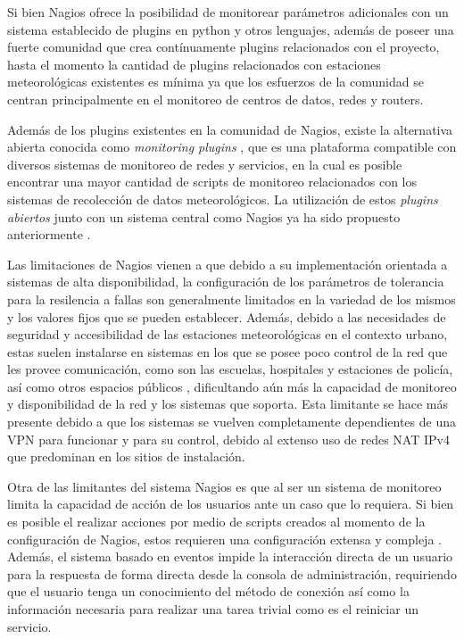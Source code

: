 Si bien Nagios ofrece la posibilidad de monitorear parámetros adicionales con un sistema establecido de plugins en python y otros lenguajes, además de poseer una fuerte comunidad que crea contínuamente plugins relacionados con el proyecto, hasta el momento la cantidad de plugins relacionados con estaciones meteorológicas existentes es mínima ya que los esfuerzos de la comunidad se centran principalmente en el monitoreo de centros de datos, redes y routers.

Además de los plugins existentes en la comunidad de Nagios, existe la alternativa abierta conocida como \textit{monitoring plugins} \cite{monitoring_plugins}, que es una plataforma compatible con diversos sistemas de monitoreo de redes y servicios, en la cual es posible encontrar una mayor cantidad de scripts de monitoreo relacionados con los sistemas de recolección de datos meteorológicos. La utilización de estos \textit{plugins abiertos} junto con un sistema central como Nagios ya ha sido propuesto anteriormente \cite{monitoreo_raspberry_nagios}.


Las limitaciones de Nagios vienen a que debido a su implementación orientada a sistemas de alta disponibilidad, la configuración de los parámetros de tolerancia para la resilencia a fallas son generalmente limitados en la variedad de los mismos y los valores fijos que se pueden establecer. Además, debido a las necesidades de seguridad y accesibilidad de las estaciones meteorológicas en el contexto urbano, estas suelen instalarse en sistemas en los que se posee poco control de la red que les provee comunicación, como son las escuelas, hospitales y estaciones de policía, así como otros espacios públicos \cite{muller_sensors_and_the_city}, dificultando aún más la capacidad de monitoreo y disponibilidad de la red y los sistemas que soporta. Esta limitante se hace más presente debido a que los sistemas se vuelven completamente dependientes de una VPN para funcionar y para su control, debido al extenso uso de redes NAT IPv4 que predominan en los sitios de instalación.

Otra de las limitantes del sistema Nagios es que al ser un sistema de monitoreo limita la capacidad de acción de los usuarios ante un caso que lo requiera. Si bien es posible el realizar acciones por medio de scripts creados al momento de la configuración de Nagios, estos requieren una configuración extensa y compleja \cite{nagios_service_restart}. Además, el sistema basado en eventos impide la interacción directa de un usuario para la respuesta de forma directa desde la consola de administración, requiriendo que el usuario tenga un conocimiento del método de conexión así como la información necesaria para realizar una tarea trivial como es el reiniciar un servicio.


